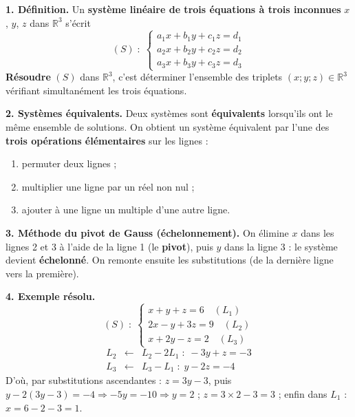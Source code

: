 \documentclass[a4paper,11pt]{article}
\begin{document}
\begin{tcolorbox}[breakable, enhanced, colback=trac!4, colframe=trac, boxrule=0.9pt,
                  arc=2pt, left=7pt, right=7pt, top=5pt, bottom=5pt,
                  title={\textbf{TRACE ÉCRITE --- Séance 2 : systèmes linéaires dans $\mathbb{R}^3$}},
                  colbacktitle=trac, coltitle=white, fonttitle=\bfseries]

\textbf{1. Définition.}
Un \textbf{système linéaire de trois équations à trois inconnues} $x$, $y$, $z$
dans $\mathbb{R}^3$ s'écrit
\[
(S)\;:\;\begin{cases}
a_1x+b_1y+c_1z=d_1\\
a_2x+b_2y+c_2z=d_2\\
a_3x+b_3y+c_3z=d_3
\end{cases}
\]
\textbf{Résoudre} $(S)$ dans $\mathbb{R}^3$, c'est déterminer l'ensemble des triplets
$(x;y;z)\in\mathbb{R}^3$ vérifiant simultanément les trois équations.

\textbf{2. Systèmes équivalents.}
Deux systèmes sont \textbf{équivalents} lorsqu'ils ont le même ensemble de
solutions. On obtient un système équivalent par l'une des \textbf{trois
opérations élémentaires} sur les lignes :
\begin{enumerate}[label=\alph*), leftmargin=*, itemsep=2pt]
  \item permuter deux lignes ;
  \item multiplier une ligne par un réel non nul ;
  \item ajouter à une ligne un multiple d'une autre ligne.
\end{enumerate}

\textbf{3. Méthode du pivot de Gauss (échelonnement).}
On élimine $x$ dans les lignes 2 et 3 à l'aide de la ligne 1 (le \textbf{pivot}),
puis $y$ dans la ligne 3 : le système devient \textbf{échelonné}. On remonte
ensuite les substitutions (de la dernière ligne vers la première).

\textbf{4. Exemple résolu.}
\[
(S)\;:\;\begin{cases}
x+y+z=6 \quad (L_1)\\
2x-y+3z=9 \quad (L_2)\\
x+2y-z=2 \quad (L_3)
\end{cases}
\]
\[
\begin{array}{rcl}
L_2 &\longleftarrow& L_2-2L_1 \;:\; -3y+z=-3\\[2pt]
L_3 &\longleftarrow& L_3-L_1 \;:\; y-2z=-4
\end{array}
\]
D'où, par substitutions ascendantes : $z=3y-3$, puis
$y-2(3y-3)=-4 \Rightarrow -5y=-10 \Rightarrow y=2$ ; $z=3\times2-3=3$ ;
enfin dans $L_1$ : $x=6-2-3=1$.


\end{tcolorbox}
\end{document}
